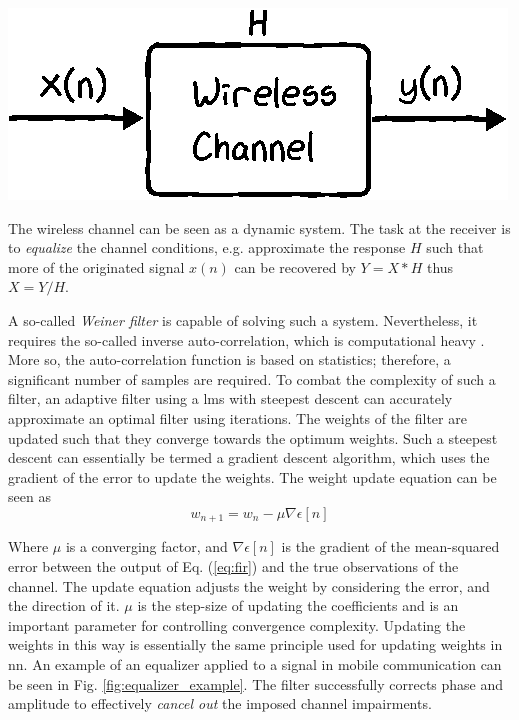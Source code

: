 \begin{marginfigure}
\includegraphics[]{chapters/part_pathloss/figures/adaptive_filter.eps}
\caption{The wireless channel can be seen as a dynamic system. The task at the receiver is to \emph{equalize} the channel conditions, e.g. approximate the response $H$ such that more of the originated signal $x(n)$ can be recovered by $Y = X*H$ thus $X = Y/H$.}\label{fig:adaptive_filter_system}
\end{marginfigure}

A so-called \emph{Weiner filter} is capable of solving such a system. Nevertheless, it requires the so-called inverse auto-correlation, which is computational heavy \cite{Tan2013DigitalProcessing}. More so, the auto-correlation function is based on statistics; therefore, a significant number of samples are required. To combat the complexity of such a filter, an adaptive filter using a \gls{lms} with steepest descent can accurately approximate an optimal filter using iterations. The weights of the filter are updated such that they converge towards the optimum weights. Such a steepest descent can essentially be termed a gradient descent algorithm, which uses the gradient of the error to update the weights. The weight update equation can be seen as
\begin{equation}
    w_{n+1} = w_n - \mu \nabla  \epsilon [n]
\end{equation}

Where $\mu$ is a converging factor, and $\nabla  \epsilon [n]$ is the gradient of the mean-squared error between the output of Eq. (\ref{eq:fir}) and the true observations of the channel. The update equation adjusts the weight by considering the error, and the direction of it. $\mu$ is the step-size of updating the coefficients and is an important parameter for controlling convergence complexity. Updating the weights in this way is essentially the same principle used for updating weights in \gls{nn}. An example of an equalizer applied to a signal in mobile communication can be seen in Fig. \ref{fig:equalizer_example}. The filter successfully corrects phase and amplitude to effectively \emph{cancel out} the imposed channel impairments.

